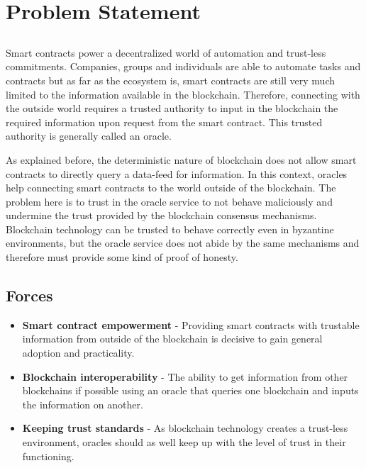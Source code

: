 \chapter{Problem Statement}\label{chap:chap4}

\section*{}


Smart contracts power a decentralized world of automation and trust-less commitments. Companies, groups and individuals are able to automate tasks and contracts but as far as the ecosystem is, smart contracts are still very much limited to the information available in the blockchain. Therefore, connecting with the outside world requires a trusted authority to input in the blockchain the required information upon request from the smart contract. This trusted authority is generally called an oracle.

As explained before, the deterministic nature of blockchain does not allow smart contracts to directly query a data-feed for information. In this context, oracles help connecting smart contracts to the world outside of the blockchain. The problem here is to trust in the oracle service to not behave maliciously and undermine the trust provided by the blockchain consensus mechanisms. Blockchain technology can be trusted to behave correctly even in byzantine environments, but the oracle service does not abide by the same mechanisms and therefore must provide some kind of proof of honesty.



\section{Forces}
\begin{itemize}
    \item \textbf{Smart contract empowerment} - Providing smart contracts with trustable information from outside of the blockchain is decisive to gain general adoption and practicality.
    \item \textbf{Blockchain interoperability} - The ability to get information from other blockchains if possible using an oracle that queries one blockchain and inputs the information on another.
    \item \textbf{Keeping trust standards} - As blockchain technology creates a trust-less environment, oracles should as well keep up with the level of trust in their functioning.
\end{itemize}


